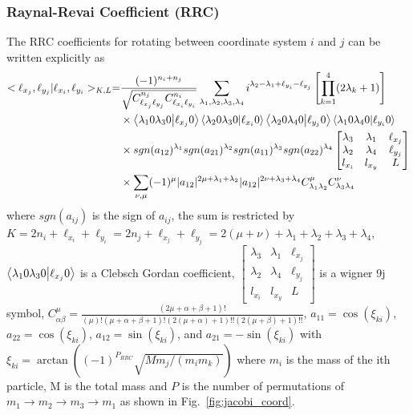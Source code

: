 \subsubsection{Raynal-Revai Coefficient (RRC)} %
\label{ssub:raynal_revai_coefficient}
The RRC coefficients for rotating between coordinate system $i$ and $j$ can be written explicitly as
\begin{align}
\nonumber
    <\ell_{x_j},\ell_{y_j}|\ell_{x_i},\ell_{y_i}>_{K,L} =& \frac{(-1)^{n_i+n_j}}{\sqrt{C_{\ell_{x_j}\ell_{y_j}}^{n_j}C_{\ell_{x_i}\ell_{y_i}}^{n_i}}} \sum\limits_{\lambda_1,\lambda_2,\lambda_3,\lambda_4} i^{\lambda_2-\lambda_1+\ell_{y_i}-\ell_{y_j}}\left[\prod_{k=1}^4 (2\lambda_k +1)\right] \\ 
\nonumber
    & \times \braket{\lambda_1 0 \lambda_3 0}{\ell_{x_j} 0} \braket{\lambda_2 0 \lambda_3 0}{\ell_{x_i} 0} \braket{\lambda_2 0 \lambda_4 0}{\ell_{y_j} 0} \braket{\lambda_1 0 \lambda_4 0}{\ell_{y_i} 0} \\
\nonumber
    & \times sgn(a_{12})^{\lambda_1}sgn(a_{21})^{\lambda_2}sgn(a_{11})^{\lambda_3}sgn(a_{22})^{\lambda_4} \begin{bmatrix}
   \lambda_3 & \lambda_1 & \ell_{x_j} \\
   \lambda_2 & \lambda_4 & \ell_{y_j} \\
   l_{x_i}   & l_{x_y}   & L
   \end{bmatrix} \\
    & \times \sum\limits_{\nu,\mu} (-1)^{\mu}|a_{12}|^{2\mu + \lambda_1 + \lambda_2} |a_{12}|^{2\nu + \lambda_3 + \lambda_4} C_{\lambda_1 \lambda_2}^{\mu} C_{\lambda_3 \lambda_4}^{\nu}
\end{align}
where $sgn(a_{ij})$ is the sign of $a_{ij}$, the sum is restricted by $K=2n_i+\ell_{x_i}+\ell_{y_i}=2n_j+\ell_{x_j}+\ell_{y_j}=2(\mu+\nu)+\lambda_1+\lambda_2+\lambda_3+\lambda_4$, $\braket{\lambda_1 0 \lambda_3 0}{\ell_{x_j} 0}$ is a Clebsch Gordan coefficient, 
     $\begin{bmatrix}
        \lambda_3 & \lambda_1 & \ell_{x_j} \\
        \lambda_2 & \lambda_4 & \ell_{y_j} \\
        l_{x_i}   & l_{x_y}   & L
        \end{bmatrix}$
is a wigner 9j symbol, 
    $C_{\alpha\beta}^\mu = \frac{(2\mu+\alpha+\beta+1)!}{(\mu)!(\mu+\alpha+\beta+1)!(2(\mu+\alpha)+1)!!(2(\mu+\beta)+1)!!}$,
$a_{11} = \cos(\xi_{ki})$,
$a_{22} = \cos(\xi_{ki})$,
$a_{12} = \sin(\xi_{ki})$, and 
$a_{21} = -\sin(\xi_{ki})$
with $\xi_{ki} = \arctan((-1)^{P_{RRC}}\sqrt{Mm_j/(m_i m_k)})$ where $m_i$ is the mass of the ith particle, M is the total mass and $P$ is the number of permutations of $m_1\rightarrow m_2\rightarrow m_3\rightarrow m_1$  as shown in Fig.~\ref{fig:jacobi_coord}.

